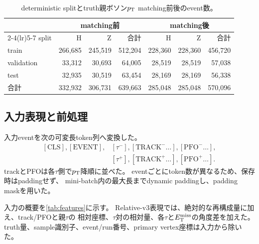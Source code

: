\documentclass[xelatex,ja=standard,a4paper,10pt,twocolumn]{bxjsarticle}
\begin{document}
\begin{table}[t]
  \centering
  \caption{deterministic splitとtruth親ボソン\(p_{\mathrm{T}}\) matching前後のevent数。}
  \label{tab:split_counts}
  \begin{tabular}{lrrrrrr}
    \toprule
    & \multicolumn{3}{c}{matching前} & \multicolumn{3}{c}{matching後} \\
    \cmidrule(lr){2-4}\cmidrule(lr){5-7}
    split & H & Z & 合計 & H & Z & 合計 \\
    \midrule
    train      & 266,685 & 245,519 & 512,204 & 228,360 & 228,360 & 456,720 \\
    validation &  33,312 &  30,693 &  64,005 &  28,519 &  28,519 &  57,038 \\
    test       &  32,935 &  30,519 &  63,454 &  28,169 &  28,169 &  56,338 \\
    \midrule
    合計       & 332,932 & 306,731 & 639,663 & 285,048 & 285,048 & 570,096 \\
    \bottomrule
  \end{tabular}
\end{table}

\subsection{入力表現と前処理}
\label{subsec:features}

入力eventを次の可変長token列へ変換した。
\begin{equation}
\begin{split}
  [\mathrm{CLS}], [\mathrm{EVENT}],&
  [\tau^-], [\mathrm{TRACK}^- \ldots], [\mathrm{PFO}^- \ldots],\\
  &[\tau^+], [\mathrm{TRACK}^+ \ldots], [\mathrm{PFO}^+ \ldots].
\end{split}
\label{eq:token_sequence}
\end{equation}
trackとPFOは各\(\tau\)側で\(p_{\mathrm{T}}\)降順に並べた。
eventごとにtoken数が異なるため、保存時はpaddingせず、
mini-batch内の最大長までdynamic paddingし、padding maskを用いた。

入力の概要を\cref{tab:features}に示す。
Relative-v3表現では、絶対的な再構成量に加え、track/PFOと親\(\tau\)の
相対座標、\(\tau\)対の相対量、各\(\tau\)と\(E_{\mathrm{T}}^{\mathrm{miss}}\)の角度差を加えた。
truth量、sample識別子、event/run番号、primary vertex座標は入力から除いた。
\end{document}
